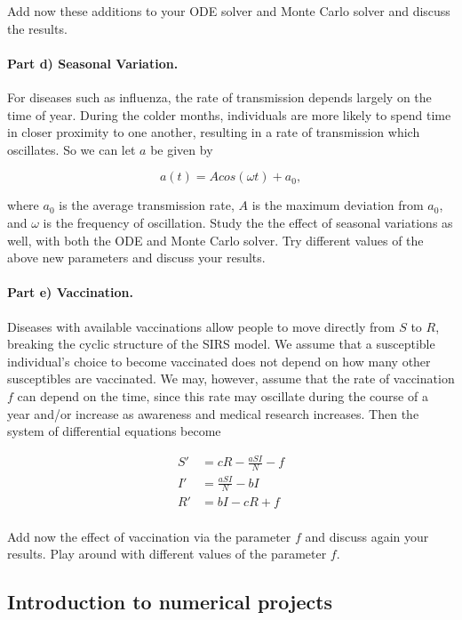 \documentclass[%
oneside,                 %
final,                   %
10pt]{article}
\begin{document}
Add now these additions to your ODE solver and Monte Carlo solver and discuss the results. 

\paragraph{Part d) Seasonal Variation.}
For diseases such as influenza, the rate of transmission depends
largely on the time of year. During the colder months, individuals are
more likely to spend time in closer proximity to one another,
resulting in a rate of transmission which oscillates. So we can let
$a$ be given by

\begin{equation}
a(t)=Acos(\omega t) + a_0,
\end{equation}

where $a_0$ is the average transmission rate, $A$ is the maximum
deviation from $a_0$, and $\omega$ is the frequency of oscillation.
Study the the effect of seasonal variations as well, with both the ODE
and Monte Carlo solver. Try different values of the above new
parameters and discuss your results.

\paragraph{Part e) Vaccination.}
Diseases with available vaccinations allow people to move directly
from $S$ to $R$, breaking the cyclic structure of the SIRS model. We
assume that a susceptible individual's choice to become vaccinated
does not depend on how many other susceptibles are vaccinated. We may,
however, assume that the rate of vaccination $f$ can depend on the
time, since this rate may oscillate during the course of a year and/or
increase as awareness and medical research increases. Then the system
of differential equations become

\begin{equation}
\begin{split}
S'&=cR-\frac{aSI}{N}-f\\
I'&=\frac{aSI}{N}-bI\\
R'&=bI-cR+f\\
\end{split}
\end{equation}

Add now the effect of vaccination via the parameter $f$ and discuss
again your results.  Play around with different values of the
parameter $f$.


\subsection{Introduction to numerical projects}
\end{document}
